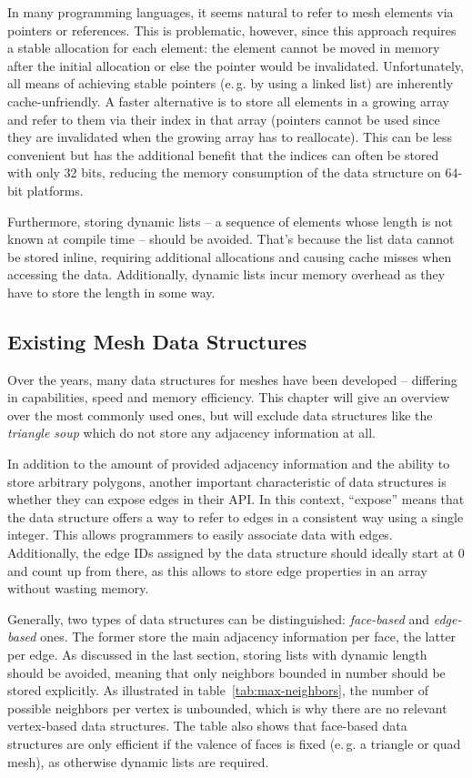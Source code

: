 In many programming languages, it seems natural to refer to mesh elements via pointers or references.
This is problematic, however, since this approach requires a stable allocation for each element: the element cannot be moved in memory after the initial allocation or else the pointer would be invalidated.
Unfortunately, all means of achieving stable pointers (e.\,g. by using a linked list) are inherently cache-unfriendly.
A faster alternative is to store all elements in a growing array and refer to them via their index in that array (pointers cannot be used since they are invalidated when the growing array has to reallocate).
This can be less convenient but has the additional benefit that the indices can often be stored with only 32 bits, reducing the memory consumption of the data structure on 64-bit platforms.

Furthermore, storing dynamic lists -- a sequence of elements whose length is not known at compile time -- should be avoided.
That's because the list data cannot be stored inline, requiring additional allocations and causing cache misses when accessing the data.
Additionally, dynamic lists incur memory overhead as they have to store the length in some way.

\newpage
\subsection{Existing Mesh Data Structures}

Over the years, many data structures for meshes have been developed -- differing in capabilities, speed and memory efficiency.
This chapter will give an overview over the most commonly used ones, but will exclude data structures like the \emph{triangle soup} which do not store any adjacency information at all.

In addition to the amount of provided adjacency information and the ability to store arbitrary polygons, another important characteristic of data structures is whether they can expose edges in their API.
In this context, \enquote{expose} means that the data structure offers a way to refer to edges in a consistent way using a single integer.
This allows programmers to easily associate data with edges.
Additionally, the edge IDs assigned by the data structure should ideally start at 0 and count up from there, as this allows to store edge properties in an array without wasting memory.

Generally, two types of data structures can be distinguished: \emph{face-based} and \emph{edge-based} ones.
The former store the main adjacency information per face, the latter per edge.
As discussed in the last section, storing lists with dynamic length should be avoided, meaning that only neighbors bounded in number should be stored explicitly.
As illustrated in table~\ref{tab:max-neighbors}, the number of possible neighbors per vertex is unbounded, which is why there are no relevant vertex-based data structures.
The table also shows that face-based data structures are only efficient if the valence of faces is fixed (e.\,g. a triangle or quad mesh), as otherwise dynamic lists are required.

